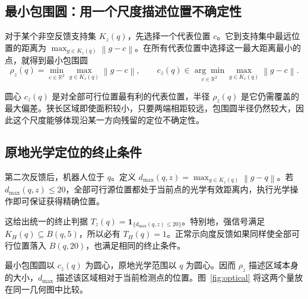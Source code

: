\documentclass[UTF8,a4paper,zihao=-4,fontset=none]{ctexart}
\numberwithin{equation}{section}
\newcommand{\ind}{\mathbf 1}
\newcommand{\norm}[1]{\left\lVert#1\right\rVert}
\begin{document}
\subsection{最小包围圆：用一个尺度描述位置不确定性}
对于某个非空反馈支持集 \(K_z(q)\)，先选择一个代表位置 \(c\)。它到支持集中最远位置的距离为 \(\max_{g\in K_z(q)}\norm{g-c}\)。在所有代表位置中选择这一最大距离最小的点，就得到最小包围圆
\begin{equation}\label{eq:mec}
\rho_z(q)=\min_{c\in\mathbb R^2}\max_{g\in K_z(q)}\norm{g-c},\qquad
c_z(q)\in\underset{c\in\mathbb R^2}{\arg\min}\max_{g\in K_z(q)}\norm{g-c}.
\end{equation}

圆心 \(c_z(q)\) 是对全部可行位置最有利的代表位置，半径 \(\rho_z(q)\) 是它仍需覆盖的最大偏差。狭长区域即使面积较小，只要两端相距较远，包围圆半径仍然较大，因此这个尺度能够体现沿某一方向残留的定位不确定性。

\subsection{原地光学定位的终止条件}
第二次反馈后，机器人位于 \(q\)。定义 \(d_{\max}(q,z)=\max_{g\in K_z(q)}\norm{g-q}\)。若 \(d_{\max}(q,z)\le20\)，全部可行源位置都处于当前点的光学有效距离内，执行光学操作即可保证获得精确位置。

这给出统一的终止判据 \(T_z(q)=\ind_{\{d_{\max}(q,z)\le20\}}\)。特别地，强信号满足 \(K_H(q)\subseteq B(q,5)\)，所以必有 \(T_H(q)=1\)。正常示向度反馈如果同样使全部可行位置落入 \(B(q,20)\)，也满足相同的终止条件。

最小包围圆以 \(c_z(q)\) 为圆心，原地光学范围以 \(q\) 为圆心。因而 \(\rho_z\) 描述区域本身的大小，\(d_{\max}\) 描述该区域相对于当前检测点的位置。图~\ref{fig:optical} 将这两个量放在同一几何图中比较。
\end{document}
